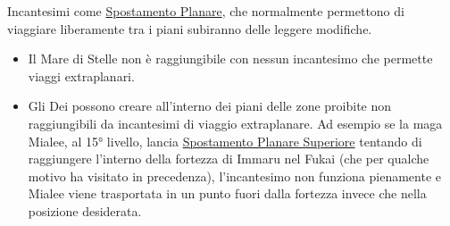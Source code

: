 \documentclass[10pt, a4paper]{report}
\begin{document}
\vfill
\begin{tcolorbox}[colback=CadetBlue!10!DNDWhite, colframe=CadetBlue!85!DNDGray, title=\fontsize{13}{15}\bfseries\textsc{Spostamento Planare e altri incantesimi}]
Incantesimi come \href{https://dndtools.net/spells/players-handbook-v35--6/plane-shift--2423/}{Spostamento Planare}, che normalmente permettono di viaggiare liberamente tra i piani subiranno delle leggere modifiche.
\begin{itemize}
	\item Il Mare di Stelle non è raggiungibile con nessun incantesimo che permette viaggi extraplanari.
	\item Gli Dei possono creare all'interno dei piani delle zone proibite non raggiungibili da incantesimi di viaggio extraplanare. Ad esempio se la maga Mialee, al 15° livello, lancia \href{https://www.dndtools.org/spells/spell-compendium--86/plane-shift-greater--4638/}{Spostamento Planare Superiore} tentando di raggiungere l'interno della fortezza di Immaru nel Fukai (che per qualche motivo ha visitato in precedenza), l'incantesimo non funziona pienamente e Mialee viene trasportata in un punto fuori dalla fortezza invece che nella posizione desiderata.
\end{itemize}
\label{planarshift}
\end{tcolorbox}
\end{document}
